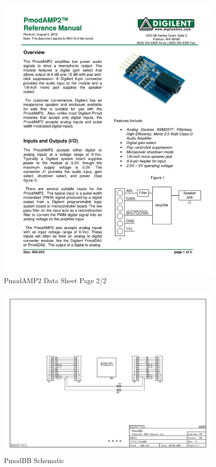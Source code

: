 \documentclass{article}
\begin{document}
	\begin{figure}[H]
	  	\centering
	  	\includegraphics[width=6.5in, page=2]{additionalDataSheets/PmodAMP2}
	  	\caption{PmodAMP2 Data Sheet Page 2/2}
	\end{figure}

	\begin{figure}[c]
	  	\centering
	  	\includegraphics[width=6.5in]{additionalDataSheets/PmodBB}
	  	\caption{PmodBB Schematic}
	\end{figure}

\end{document}
